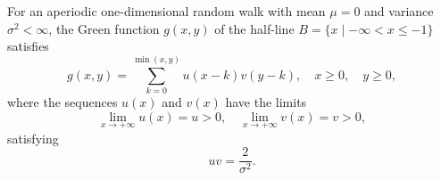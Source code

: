 For an aperiodic one-dimensional random walk with mean $\mu = 0$ and variance $\sigma^2 < \infty$, the Green function $g(x,y)$ of the half-line $B = \{x \mid -\infty < x \leq -1\}$ satisfies
$$g(x,y) = \sum_{k=0}^{\min(x,y)} u(x-k) v(y-k), \quad x \geq 0, \quad y \geq 0,$$
where the sequences $u(x)$ and $v(x)$ have the limits
$$\lim_{x \to +\infty} u(x) = u > 0, \quad \lim_{x \to +\infty} v(x) = v > 0,$$
satisfying
$$u v = \frac{2}{\sigma^2}.$$
